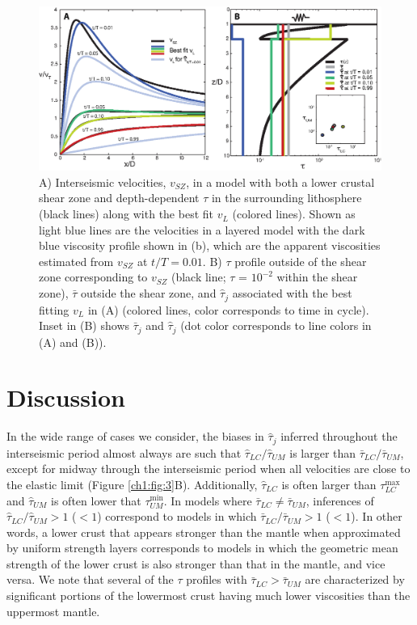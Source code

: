 \begin{figure}
\includegraphics{ch1/figures/Figure4.eps}
\caption{A) Interseismic velocities, $v_{SZ}$, in a model with both a
lower crustal shear zone and depth-dependent $\tau$ in the surrounding
lithosphere (black lines) along with the best fit $v_{L}$ (colored
lines).  Shown as light blue lines are the velocities in a layered
model with the dark blue viscosity profile shown in (b), which are the
apparent viscosities estimated from $v_{SZ}$ at $t/T = 0.01$.  B)
$\tau$ profile outside of the shear zone corresponding to $v_{SZ}$
(black line; $\tau$ = $10^{-2}$ within the shear zone), $\bar{\tau}$
outside the shear zone, and $\hat{\tau}_j$ associated with the best
fitting $v_{L}$ in (A) (colored lines, color corresponds to time in
cycle). Inset in (B) shows $\bar{\tau}_j$ and $\hat{\tau}_j$ (dot
color corresponds to line colors in (A) and (B)).}
\label{ch1:fig:4}
\end{figure}

\section{Discussion}
In the wide range of cases we consider, the biases in $\hat{\tau}_j$
inferred throughout the interseismic period almost always are such
that $\hat{\tau}_{LC}/\hat{\tau}_{UM}$ is larger than
$\bar{\tau}_{LC}/\bar{\tau}_{UM}$, except for midway through the
interseismic period when all velocities are close to the elastic limit
(Figure \ref{ch1:fig:3}B).  Additionally, $\hat{\tau}_{LC}$ is often
larger than $\tau^{\max}_{LC}$ and $\hat{\tau}_{UM}$ is often lower
that $\tau^{\min}_{UM}$.  In models where $\bar{\tau}_{LC} \ne
\bar{\tau}_{UM}$, inferences of $\hat{\tau}_{LC}/\hat{\tau}_{UM}>1$
($<1$) correspond to models in which
$\bar{\tau}_{LC}/\bar{\tau}_{UM}>1$ ($<1$). In other words, a lower
crust that appears stronger than the mantle when approximated by
uniform strength layers corresponds to models in which the geometric
mean strength of the lower crust is also stronger than that in the
mantle, and vice versa.  We note that several of the $\tau$ profiles
with $\bar{\tau}_{LC} > \bar{\tau}_{UM}$ are characterized by
significant portions of the lowermost crust having much lower
viscosities than the uppermost mantle.

